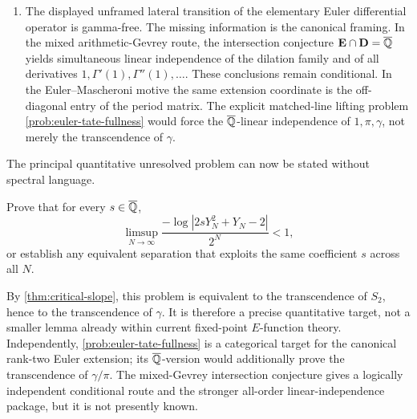 \begin{enumerate}[label=\textup{(\arabic*)}]
 exact logarithmic linear forms, positivity, and the endpoint factor
 \(p^{(1-\theta)n}\).  Even after the whole factor is favorably credited as
 fixed-place gain, the universal saddle-cancellation inequality shows that
 this ledger does not improve the Pr\'evost baseline.  Balanced factorial
 ratios themselves have only \(O(\log n)\) fixed-prime valuation.
 \item The displayed unframed lateral transition of the elementary Euler
 differential operator is gamma-free.  The missing information is the
 canonical framing.  In the mixed arithmetic-Gevrey route, the intersection
 conjecture \(\mathbf E\cap\mathbf D=\overline{\mathbb Q}\) yields simultaneous linear
 independence of the dilation family and of all derivatives
 \(1,\Gamma'(1),\Gamma''(1),\ldots\).  These conclusions remain
 conditional.  In the Euler--Mascheroni motive the same extension
 coordinate is the off-diagonal entry of the period matrix.  The explicit
 matched-line lifting problem \cref{prob:euler-tate-fullness} would force
 the \(\overline{\mathbb Q}\)-linear independence of \(1,\pi,\gamma\), not merely the
 transcendence of \(\gamma\).
\end{enumerate}

The principal quantitative unresolved problem can now be stated without
spectral language.

\begin{problem}
\label{prob:common-coefficient}
Prove that for every \(s\in\overline{\mathbb Q}\),
\[
 \limsup_{N\to\infty}
 \frac{-\log|2sY_N^2+Y_N-2|}{2^N}<1,
\]
or establish any equivalent separation that exploits the same coefficient
\(s\) across all \(N\).
\end{problem}

By \cref{thm:critical-slope}, this problem is equivalent to the
transcendence of \(S_2\), hence to the transcendence of \(\gamma\).  It is
therefore a precise quantitative target, not a smaller lemma already within
current fixed-point \(E\)-function theory.  Independently,
\cref{prob:euler-tate-fullness} is a categorical target for the canonical
rank-two Euler extension; its \(\overline{\mathbb Q}\)-version would additionally prove
the transcendence of \(\gamma/\pi\).  The mixed-Gevrey intersection
conjecture gives a logically independent conditional route and the stronger
all-order linear-independence package, but it is not presently known.

